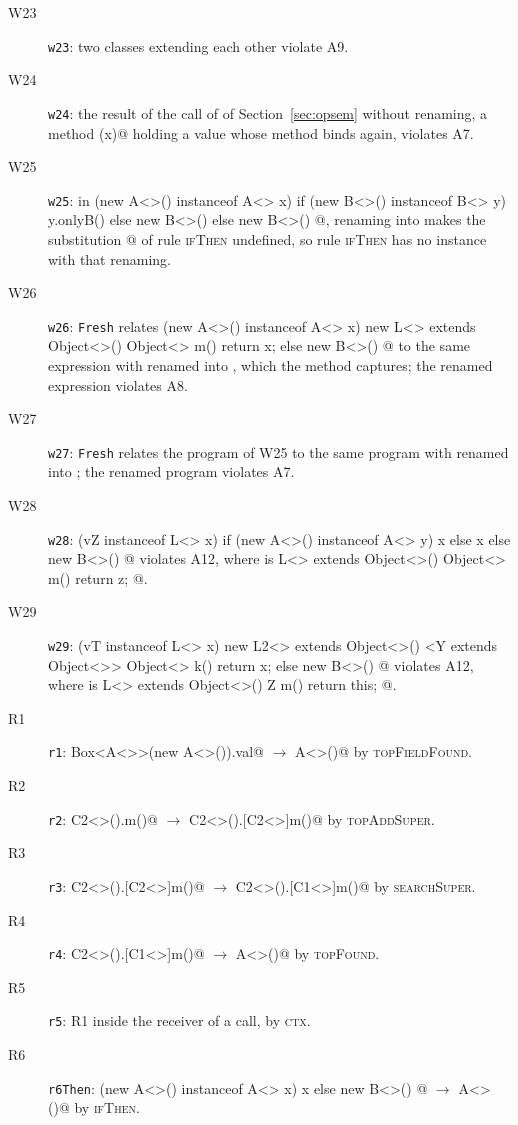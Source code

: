 \begin{description}
\item[W23] \texttt{w23}: two classes extending each other violate A9.
\item[W24] \texttt{w24}: the result of the call of \Q@k@ of Section~\ref{sec:opsem} without renaming, a method \Q@m(x)@ holding a value whose method \Q@m@ binds \Q@x@ again, violates A7.
\item[W25] \texttt{w25}: in \Q@if (new A<>() instanceof A<> x){ if (new B<>() instanceof B<> y){ y.onlyB() } else { new B<>() } } else { new B<>() }@, renaming \Q@y@ into \Q@x@ makes the substitution \Q@[x=new A<>()]@ of rule \textsc{ifThen} undefined, so rule \textsc{ifThen} has no instance with that renaming.
\item[W26] \texttt{w26}: \texttt{Fresh} relates \Q@if (new A<>() instanceof A<> x){ new L<> extends Object<>(){ Object<> m(){ return x; } } } else { new B<>() }@ to the same expression with \Q@x@ renamed into \Q@this@, which the method \Q@m@ captures; the renamed expression violates A8.
\item[W27] \texttt{w27}: \texttt{Fresh} relates the program of W25 to the same program with \Q@y@ renamed into \Q@x@; the renamed program violates A7.
\item[W28] \texttt{w28}: \Q@if (vZ instanceof L<> x){ if (new A<>() instanceof A<> y){ x } else { x } } else { new B<>() }@ violates A12, where \Q@vZ@ is \Q@new L<> extends Object<>(){ Object<> m(){ return z; } }@.
\item[W29] \texttt{w29}: \Q@if (vT instanceof L<> x){ new L2<> extends Object<>(){ <Y extends Object<>> Object<> k(){ return x; } } } else { new B<>() }@ violates A12, where \Q@vT@ is \Q@new L<> extends Object<>(){ Z m(){ return this; } }@.
\item[R1] \texttt{r1}: \Q@new Box<A<>>(new A<>()).val@ $\rightarrow$ \Q@new A<>()@ by \textsc{topFieldFound}.
\item[R2] \texttt{r2}: \Q@new C2<>().m()@ $\rightarrow$ \Q@new C2<>().[C2<>]m()@ by \textsc{topAddSuper}.
\item[R3] \texttt{r3}: \Q@new C2<>().[C2<>]m()@ $\rightarrow$ \Q@new C2<>().[C1<>]m()@ by \textsc{searchSuper}.
\item[R4] \texttt{r4}: \Q@new C2<>().[C1<>]m()@ $\rightarrow$ \Q@new A<>()@ by \textsc{topFound}.
\item[R5] \texttt{r5}: R1 inside the receiver of a call, by \textsc{ctx}.
\item[R6] \texttt{r6Then}: \Q@if (new A<>() instanceof A<> x){ x } else { new B<>() }@ $\rightarrow$ \Q@new A<>()@ by \textsc{ifThen}.

\end{description}
